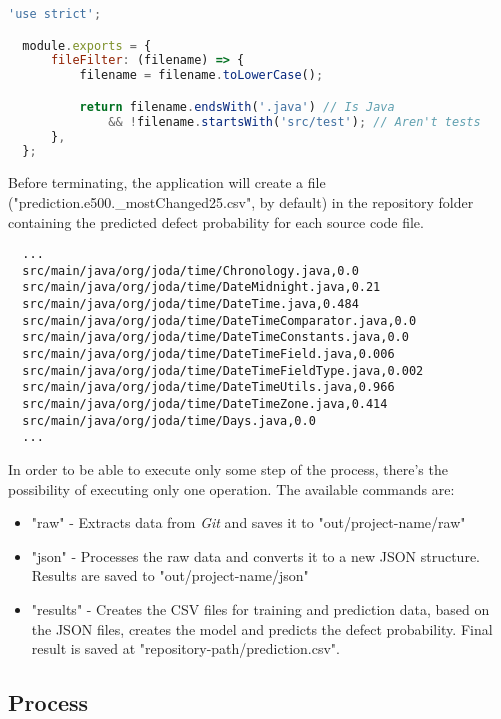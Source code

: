 \begin{lstlisting}[language=Javascript]
  'use strict';

  module.exports = {
      fileFilter: (filename) => {
          filename = filename.toLowerCase();

          return filename.endsWith('.java') // Is Java
              && !filename.startsWith('src/test'); // Aren't tests
      },
  };
\end{lstlisting}

Before terminating, the application will create a file ("prediction.e500.\_mostChanged25.csv", by default) in the repository folder containing the predicted defect probability for each source code file.

\begin{lstlisting}
  ...
  src/main/java/org/joda/time/Chronology.java,0.0
  src/main/java/org/joda/time/DateMidnight.java,0.21
  src/main/java/org/joda/time/DateTime.java,0.484
  src/main/java/org/joda/time/DateTimeComparator.java,0.0
  src/main/java/org/joda/time/DateTimeConstants.java,0.0
  src/main/java/org/joda/time/DateTimeField.java,0.006
  src/main/java/org/joda/time/DateTimeFieldType.java,0.002
  src/main/java/org/joda/time/DateTimeUtils.java,0.966
  src/main/java/org/joda/time/DateTimeZone.java,0.414
  src/main/java/org/joda/time/Days.java,0.0
  ...
\end{lstlisting}


In order to be able to execute only some step of the process, there's the possibility of executing only one operation. The available commands are:
%
\begin{itemize}
\item "raw" - Extracts data from \emph{Git} and saves it to "out/{project-name}/raw"
\item "json" - Processes the raw data and converts it to a new JSON structure. Results are saved to "out/{project-name}/json"
\item "results" - Creates the CSV files for training and prediction data, based on the JSON files, creates the model and predicts the defect probability.
Final result is saved at "{repository-path}/prediction.csv".
\end{itemize}

\subsection{Process}

